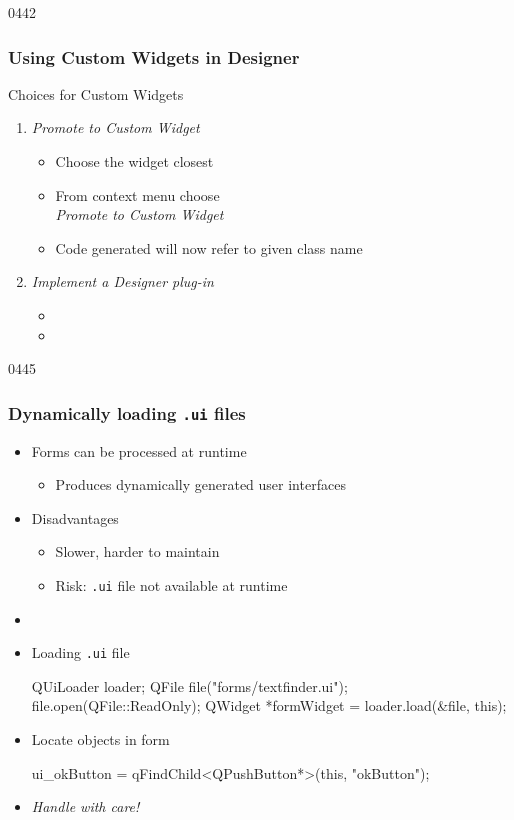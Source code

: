 \begin{slide}[fragile]{0442}\frametitle{Using Custom Widgets in Designer}\label{designer_plugins}
Choices for Custom Widgets
\begin{enumerate}
\item \emph{Promote to Custom Widget}
  \begin{itemize}
  \item Choose the widget closest
  \item From context menu choose \\ \emph{Promote to Custom Widget}
  \item Code generated will now refer to given class name
  \end{itemize}
\item \emph{Implement a Designer plug-in}
  \begin{itemize}
  \item {}
  \item {}
  \end{itemize}
\end{enumerate}
\end{slide}

\begin{slide}[fragile]{0445}\frametitle{Dynamically loading \texttt{.ui} files}
\begin{itemize}
\item Forms can be processed at runtime
  \begin{itemize}
  \item Produces dynamically generated user interfaces
  \end{itemize}
\item Disadvantages
  \begin{itemize}
  \item Slower, harder to maintain
  \item Risk: \texttt{.ui} file not available at runtime
  \end{itemize}
\item[] 
\item Loading \texttt{.ui} file
 \begin{cpp}
QUiLoader loader;
QFile file("forms/textfinder.ui");
file.open(QFile::ReadOnly);
QWidget *formWidget = loader.load(&file, this);
\end{cpp}
\item Locate objects in form
\begin{cpp}
ui_okButton = qFindChild<QPushButton*>(this, "okButton");
\end{cpp}
\item \emph{Handle with care!}

\end{itemize}
\end{slide}


